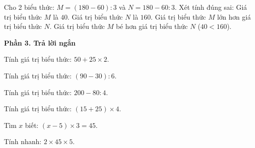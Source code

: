 \begin{ex} %
Cho 2 biểu thức: $M = (180 - 60) : 3$ và $N = 180 - 60 : 3$. Xét tính đúng sai:
\choiceTF
{\True Giá trị biểu thức $M$ là $40$.}
{\True Giá trị biểu thức $N$ là $160$.}
{Giá trị biểu thức $M$ lớn hơn giá trị biểu thức $N$.}
{\True Giá trị biểu thức $M$ bé hơn giá trị biểu thức $N$ ($40 < 160$).}
\end{ex}

\textbf{Phần 3. Trả lời ngắn}

\begin{ex} %
Tính giá trị biểu thức: $50 + 25 \times 2$.
\end{ex}

\begin{ex} %
Tính giá trị biểu thức: $(90 - 30) : 6$.
\end{ex}

\begin{ex} %
Tính giá trị biểu thức: $200 - 80 : 4$.
\end{ex}

\begin{ex} %
Tính giá trị biểu thức: $(15 + 25) \times 4$.
\end{ex}

\begin{ex} %
Tìm $x$ biết: $(x - 5) \times 3 = 45$.
\end{ex}

\begin{ex} %
Tính nhanh: $2 \times 45 \times 5$.
\end{ex}
